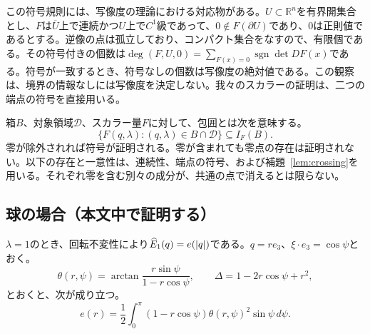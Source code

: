 この符号規則には、写像度の理論における対応物がある。$U\subset\mathbb R^n$を有界開集合とし、$F$は$\overline U$上で連続かつ$U$上で$C^1$級であって、$0\notin F(\partial U)$であり、$0$は正則値であるとする。逆像の点は孤立しており、コンパクト集合をなすので、有限個である。その符号付きの個数は$\deg(F,U,0)=\sum_{F(x)=0}\operatorname{sgn}\det DF(x)$である。符号が一致するとき、符号なしの個数は写像度の絶対値である。この観察は、境界の情報なしには写像度を決定しない。我々のスカラーの証明は、二つの端点の符号を直接用いる。

箱$B$、対象領域$\mathcal D$、スカラー量$F$に対して、包囲とは次を意味する。
\begin{equation}\label{eq:enclosure}
 \{F(q,\lambda):(q,\lambda)\in B\cap\mathcal D\}\subseteq I_F(B).
\end{equation}
零が除外されれば符号が証明される。零が含まれても零点の存在は証明されない。以下の存在と一意性は、連続性、端点の符号、および補題~\ref{lem:crossing}を用いる。それぞれ零を含む別々の成分が、共通の点で消えるとは限らない。

\subsection{球の場合（本文中で証明する）}\label{sec:sphere}
$\lambda=1$のとき、回転不変性により$\widehat E_1(q)=e(|q|)$である。$q=re_3$、$\xi\cdot e_3=\cos\psi$とおく。
\[
 \theta(r,\psi)=\arctan\frac{r\sin\psi}{1-r\cos\psi},\qquad
 \Delta=1-2r\cos\psi+r^2,
\]
とおくと、次が成り立つ。
\begin{equation}\label{eq:sphere_energy}
 e(r)=\frac12\int_0^\pi(1-r\cos\psi)\theta(r,\psi)^2\sin\psi\,d\psi.
\end{equation}

